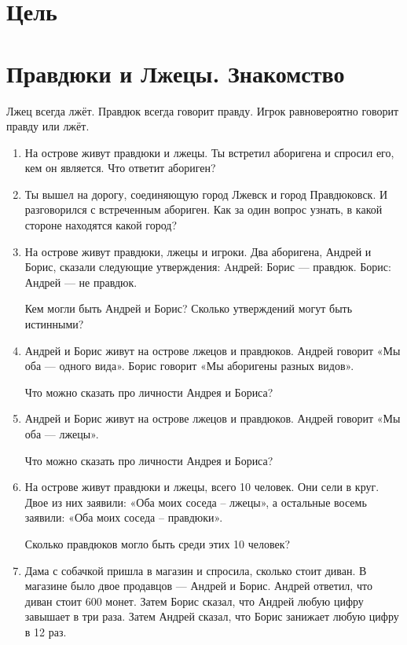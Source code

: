 \documentclass[12pt]{article}
\theoremstyle{definition}
\begin{document}
\tableofcontents{}

\section*{Цель}




\setcounter{section}{0}
\section{Правдюки и Лжецы. Знакомство}

Лжец всегда лжёт. Правдюк всегда говорит правду. Игрок равновероятно говорит правду или лжёт. 

\begin{enumerate}
  \item На острове живут правдюки и лжецы. 
  Ты встретил аборигена и спросил его, кем он является. Что ответит абориген? 
  
  \item Ты вышел на дорогу, соединяющую город Лжевск и город Правдюковск. И разговорился с встреченным абориген. 
  Как за один вопрос узнать, в какой стороне находятся какой город?
  
  \item На острове живут правдюки, лжецы и игроки. Два аборигена, Андрей и Борис, сказали следующие утверждения:
  Aндрей: Борис — правдюк.
  Борис: Андрей — не правдюк.

  Кем могли быть Андрей и Борис? Сколько утверждений могут быть истинными?


  \item Андрей и Борис живут на острове лжецов и правдюков. Андрей говорит «Мы оба — одного вида». 
  Борис говорит «Мы аборигены разных видов».
  
  Что можно сказать про личности Андрея и Бориса?

  \item Андрей и Борис живут на острове лжецов и правдюков. Андрей говорит «Мы оба — лжецы». 
  
  Что можно сказать про личности Андрея и Бориса?


  \item На острове живут правдюки и лжецы, всего 10 человек. Они сели в круг. 
  Двое из них заявили: «Оба моих соседа – лжецы», а остальные восемь заявили: «Оба моих соседа – правдюки». 
  
  Сколько правдюков могло быть среди этих 10 человек? 


  \item Дама с собачкой пришла в магазин и спросила, сколько стоит диван. 
  В магазине было двое продавцов — Андрей и Борис. Андрей ответил, что диван стоит 600 монет.
  Затем Борис сказал, что Андрей любую цифру завышает в три раза.
  Затем Андрей сказал, что Борис занижает любую цифру в 12 раз.


\end{enumerate}
\end{document}
